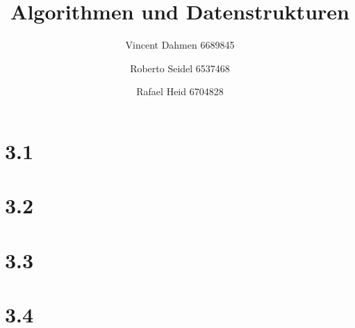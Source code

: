\documentclass[12pt,a4paper]{article}
\title{Algorithmen und Datenstrukturen}
\author{Vincent Dahmen 6689845 \and Roberto Seidel 6537468 \and Rafael Heid 6704828}
\begin{document}
\maketitle{}


\section*{3.1}

\newpage
\section*{3.2}


\section*{3.3}


\section*{3.4}

\end{document}
